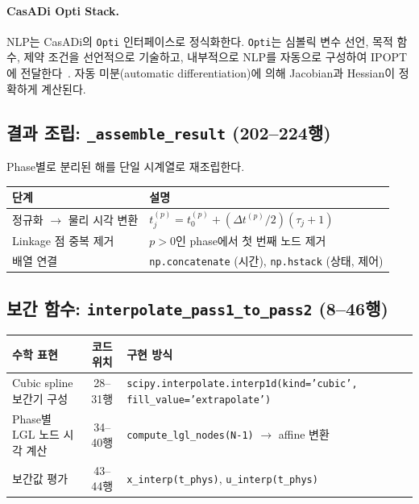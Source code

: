 \documentclass[11pt]{article}
\begin{document}
\paragraph{CasADi Opti Stack.}
NLP는 CasADi의 \texttt{Opti} 인터페이스로 정식화한다.
\texttt{Opti}는 심볼릭 변수 선언, 목적 함수, 제약 조건을 선언적으로 기술하고, 내부적으로 NLP를 자동으로 구성하여 IPOPT에 전달한다~\cite{Wachter2006}.
자동 미분(automatic differentiation)에 의해 Jacobian과 Hessian이 정확하게 계산된다.


\subsection{결과 조립: \texttt{\_assemble\_result} (202--224행)}
\label{sec:assemble_result}

Phase별로 분리된 해를 단일 시계열로 재조립한다.

\begin{table}[htbp]
\centering
\begin{tabular}{ll}
\toprule
단계 & 설명 \\
\midrule
정규화 $\to$ 물리 시각 변환 & $t_j^{(p)} = t_0^{(p)} + (\Delta t^{(p)}/2)(\tau_j + 1)$ \\
Linkage 점 중복 제거 & $p > 0$인 phase에서 첫 번째 노드 제거 \\
배열 연결 & \texttt{np.concatenate} (시간), \texttt{np.hstack} (상태, 제어) \\
\bottomrule
\end{tabular}
\end{table}


\subsection{보간 함수: \texttt{interpolate\_pass1\_to\_pass2} (8--46행)}
\label{sec:interpolation}

\begin{table}[htbp]
\centering
\small
\begin{tabular}{p{4cm}cp{5.5cm}}
\toprule
수학 표현 & 코드 위치 & 구현 방식 \\
\midrule
Cubic spline 보간기 구성 & 28--31행 & \texttt{scipy.interpolate.interp1d(kind='cubic', fill\_value='extrapolate')} \\
Phase별 LGL 노드 시각 계산 & 34--40행 & \texttt{compute\_lgl\_nodes(N-1)} $\to$ affine 변환 \\
보간값 평가 & 43--44행 & \texttt{x\_interp(t\_phys)}, \texttt{u\_interp(t\_phys)} \\
\bottomrule
\end{tabular}
\end{table}
\end{document}
